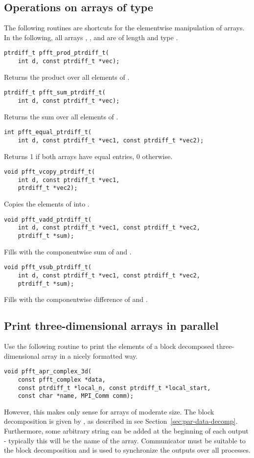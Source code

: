 \subsection{Operations on arrays of type }
The following routines are shortcuts for the elementwise manipulation of  arrays.
In the following, all arrays  , , and  are of length  and type .
\begin{lstlisting}
ptrdiff_t pfft_prod_ptrdiff_t(
    int d, const ptrdiff_t *vec);
\end{lstlisting}
Returns the product over all elements of .
\begin{lstlisting}
ptrdiff_t pfft_sum_ptrdiff_t(
    int d, const ptrdiff_t *vec);
\end{lstlisting}
Returns the sum over all elements of .
\begin{lstlisting}
int pfft_equal_ptrdiff_t(
    int d, const ptrdiff_t *vec1, const ptrdiff_t *vec2);
\end{lstlisting}
Returns 1 if both arrays have equal entries, 0 otherwise.
\begin{lstlisting}
void pfft_vcopy_ptrdiff_t(
    int d, const ptrdiff_t *vec1,
    ptrdiff_t *vec2);
\end{lstlisting}
Copies the elements of  into .
\begin{lstlisting}
void pfft_vadd_ptrdiff_t(
    int d, const ptrdiff_t *vec1, const ptrdiff_t *vec2,
    ptrdiff_t *sum);
\end{lstlisting}
Fills  with the componentwise sum of  and .
\begin{lstlisting}
void pfft_vsub_ptrdiff_t(
    int d, const ptrdiff_t *vec1, const ptrdiff_t *vec2,
    ptrdiff_t *sum);
\end{lstlisting}
Fills  with the componentwise difference of  and .

\subsection{Print three-dimensional arrays in parallel}
Use the following routine to print the elements of a block decomposed three-dimensional array  in a nicely formatted way.
\begin{lstlisting}
void pfft_apr_complex_3d(
    const pfft_complex *data,
    const ptrdiff_t *local_n, const ptrdiff_t *local_start,
    const char *name, MPI_Comm comm);
\end{lstlisting}
However, this makes only sense for arrays of moderate size.
The block decomposition is given by ,  as described in see Section~\ref{sec:par-data-decomp}.
Furthermore, some arbitrary string  can be added at the beginning of each output - typically this will be the name of the array.
Communicator  must be suitable to the block decomposition and is used to synchronize the outputs over all processes.

